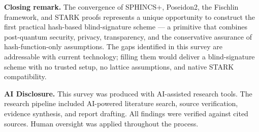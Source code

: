 \documentclass[11pt,a4paper]{article}
\begin{document}
\medskip\noindent\textbf{Closing remark.}  The convergence of SPHINCS+, Poseidon2, the
Fischlin framework, and STARK proofs represents a unique opportunity to construct the first
practical hash-based blind-signature scheme --- a primitive that combines post-quantum security,
privacy, transparency, and the conservative assurance of hash-function-only assumptions.
The gaps identified in this survey are addressable with current technology; filling them
would deliver a blind-signature scheme with no trusted setup, no lattice assumptions, and
native STARK compatibility.

\medskip
\noindent\textbf{AI Disclosure.}  This survey was produced with AI-assisted research tools.
The research pipeline included AI-powered literature search, source verification, evidence
synthesis, and report drafting.  All findings were verified against cited sources.  Human
oversight was applied throughout the process.

\medskip
\printbibliography[title={References}]
\end{document}
